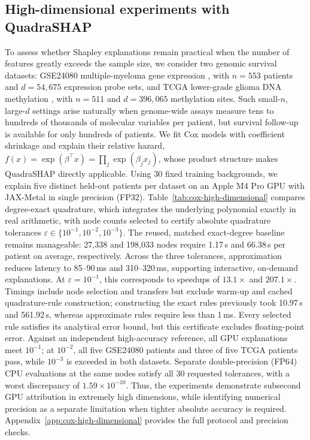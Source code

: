 \subsection{High-dimensional experiments with QuadraSHAP}
\label{sec:cox-high-dimensional-main}

To assess whether Shapley explanations remain practical when the number of
features greatly exceeds the sample size, we consider two genomic survival
datasets: GSE24080 multiple-myeloma gene expression
\cite{geo_gse24080}, with $n=553$ patients and $d=54{,}675$ expression
probe sets, and TCGA lower-grade glioma DNA methylation
\cite{tcga_lgg_methylation}, with $n=511$ and $d=396{,}065$ methylation
sites. Such small-$n$, large-$d$ settings arise naturally when genome-wide
assays measure tens to hundreds of thousands of molecular variables per patient, but survival
follow-up is available for only hundreds of patients. We fit Cox models
with coefficient shrinkage and explain their relative hazard,
$f(x)=\exp(\beta^\top x)=\prod_j\exp(\beta_jx_j)$, whose product
structure makes QuadraSHAP directly applicable. Using 30 fixed training
backgrounds, we explain five distinct held-out patients per dataset on an
Apple M4 Pro GPU with JAX-Metal in single precision (FP32).
Table~\ref{tab:cox-high-dimensional} compares degree-exact quadrature,
which integrates the underlying polynomial exactly in real arithmetic,
with node counts selected to certify absolute quadrature tolerances
$\varepsilon\in\{10^{-1},10^{-2},10^{-3}\}$.
The reused, matched exact-degree baseline remains manageable: 27,338 and 198,033
nodes require 1.17\,s and 66.38\,s per patient on average, respectively.
Across the three tolerances, approximation reduces latency to 85--90\,ms
and 310--320\,ms, supporting interactive, on-demand explanations.
At $\varepsilon=10^{-1}$, this corresponds to speedups of
$13.1\times$ and $207.1\times$. Timings include node selection and
transfers but exclude warm-up and cached
quadrature-rule construction; constructing the exact rules previously
took 10.97\,s and 561.92\,s, whereas approximate rules require less
than 1\,ms. Every selected rule satisfies its analytical error bound,
but this certificate excludes floating-point error. Against an independent
high-accuracy reference, all GPU explanations meet $10^{-1}$; at
$10^{-2}$, all five GSE24080 patients and three of five TCGA patients
pass, while $10^{-3}$ is exceeded in both datasets. Separate
double-precision (FP64) CPU evaluations at the same nodes satisfy all
30 requested tolerances, with a worst discrepancy of
$1.59\times10^{-10}$. Thus, the experiments demonstrate subsecond GPU
attribution in extremely high dimensions, while identifying numerical
precision as a separate limitation when tighter absolute accuracy is
required. Appendix~\ref{app:cox-high-dimensional} provides the full
protocol and precision checks.
